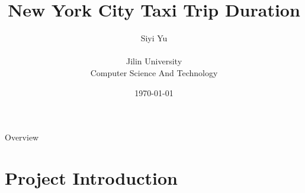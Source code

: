 \documentclass[
 size=14pt,
 paper=smartboard,  %
 mode=present, 		%
 display=slides, 	%
 style=tuliplab,  	%
 pauseslide,
 fleqn,leqno]{powerdot}
\title{New York City Taxi Trip Duration}
\author{
Siyi Yu
\\
\\Jilin University
\\Computer Science And Technology
}
\date{\today}
\begin{document}
\maketitle



\begin{slide}[toc=,bm=]{Overview}
\tableofcontents[content=currentsection,type=1]
\end{slide}


\section{Project Introduction}
\end{document}
